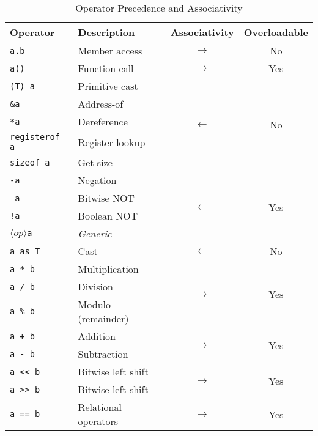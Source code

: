 \begin{table}[h]
    \centering
    \caption{Operator Precedence and Associativity}
    \begin{tabular}{|l|l|c|c|}
        \hline
        \textbf{Operator} & \textbf{Description} & \textbf{Associativity} & \textbf{Overloadable} \\
        \hline
        \texttt{a.b} & Member access & \(\longrightarrow\) & No \\
        \hline
        \texttt{a()} & Function call & \(\longrightarrow\) & Yes \\
        \hline
        \texttt{(T) a} & Primitive cast & \multirow{5}{*}{\(\longleftarrow\)} & \multirow{5}{*}{No} \\
        \texttt{\&a} & Address-of & & \\
        \texttt{*a} & Dereference & & \\
        \texttt{registerof a} & Register lookup & & \\
        \texttt{sizeof a} & Get size & & \\
        \hline
        \texttt{-a} & Negation & \multirow{4}{*}{\(\longleftarrow\)} & \multirow{4}{*}{Yes} \\
        \texttt{~a} & Bitwise NOT & & \\
        \texttt{!a} & Boolean NOT & & \\
        \(\langle op \rangle\)\texttt{a} & \textit{Generic} & & \\
        \hline
        \texttt{a as T} & Cast & \(\longleftarrow\) & No \\
        \hline
        \texttt{a * b} & Multiplication & \multirow{3}{*}{\(\longrightarrow\)} & \multirow{3}{*}{Yes} \\
        \texttt{a / b} & Division & & \\
        \texttt{a \% b} & Modulo (remainder) & & \\
        \hline
        \texttt{a + b} & Addition & \multirow{2}{*}{\(\longrightarrow\)} & \multirow{2}{*}{Yes} \\
        \texttt{a - b} & Subtraction & & \\
        \hline
        \texttt{a << b} & Bitwise left shift & \multirow{2}{*}{\(\longrightarrow\)} & \multirow{2}{*}{Yes} \\
        \texttt{a >> b} & Bitwise left shift & & \\
        \hline
        \texttt{a == b} & \multirow{6}{*}{Relational operators} & \multirow{6}{*}{\(\longrightarrow\)} & \multirow{6}{*}{Yes} \\

\end{tabular}
\end{table}
